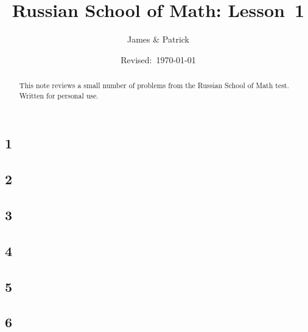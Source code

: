 \documentclass[12pt]{article}
\title{Russian School of Math: Lesson~1}
\author{James \& Patrick}
\date{Revised:~\today}
\begin{document}
\maketitle
\begin{abstract}\setlength{\parindent}{0pt}%
This note reviews a small number of problems from the Russian School of Math test. Written for personal use.
\end{abstract}

\thispagestyle{empty}
\clearpage

\subsection*{1}

\begin{solution}
  
\end{solution}

\subsection*{2}

\begin{solution}
  
\end{solution}

\subsection*{3}

\begin{solution}
  
\end{solution}

\subsection*{4}

\begin{solution}
  
\end{solution}

\subsection*{5}

\begin{solution}
  
\end{solution}

\subsection*{6}

\begin{solution}
  
\end{solution}
\end{document}
